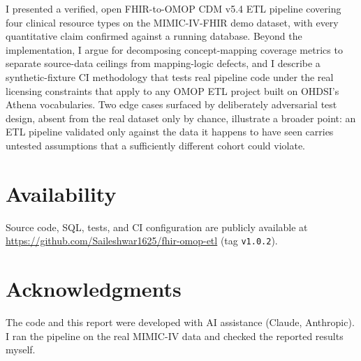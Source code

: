 \documentclass[11pt]{article}
\begin{document}
I presented a verified, open FHIR-to-OMOP CDM v5.4 ETL pipeline covering
four clinical resource types on the MIMIC-IV-FHIR demo dataset, with every
quantitative claim confirmed against a running database. Beyond the implementation, I argue for decomposing
concept-mapping coverage metrics to separate source-data ceilings from
mapping-logic defects, and I describe a synthetic-fixture CI methodology
that tests real pipeline code under the real licensing constraints that
apply to any OMOP ETL project built on OHDSI's Athena vocabularies. Two
edge cases surfaced by deliberately adversarial test design, absent from
the real dataset only by chance, illustrate a broader point: an ETL
pipeline validated only against the data it happens to have seen carries
untested assumptions that a sufficiently different cohort could violate.

\section*{Availability}
\label{sec:availability}
Source code, SQL, tests, and CI configuration are publicly available at
\url{https://github.com/Saileshwar1625/fhir-omop-etl} (tag \texttt{v1.0.2}).

\section*{Acknowledgments}
The code and this report were developed with AI assistance (Claude,
Anthropic). I ran the pipeline on the real MIMIC-IV data and checked the
reported results myself.
\end{document}
